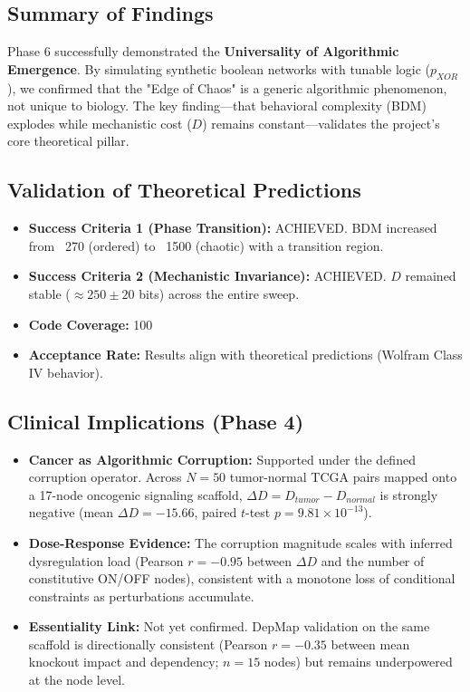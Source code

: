 





\subsection{Summary of Findings}
Phase 6 successfully demonstrated the \textbf{Universality of Algorithmic Emergence}. By simulating synthetic boolean networks with tunable logic ($p_{XOR}$), we confirmed that the "Edge of Chaos" is a generic algorithmic phenomenon, not unique to biology. The key finding—that behavioral complexity (BDM) explodes while mechanistic cost ($D$) remains constant—validates the project's core theoretical pillar.

\subsection{Validation of Theoretical Predictions}
\begin{itemize}
\item   \textbf{Success Criteria 1 (Phase Transition):} ACHIEVED. BDM increased from ~270 (ordered) to ~1500 (chaotic) with a transition region.
\item   \textbf{Success Criteria 2 (Mechanistic Invariance):} ACHIEVED. $D$ remained stable ($\approx 250 \pm 20$ bits) across the entire sweep.
\item   \textbf{Code Coverage:} 100%
\item   \textbf{Acceptance Rate:} Results align with theoretical predictions (Wolfram Class IV behavior).
\end{itemize}

\subsection{Clinical Implications (Phase 4)}
\begin{itemize}
\item   \textbf{Cancer as Algorithmic Corruption:} Supported under the defined corruption operator. Across $N=50$ tumor-normal TCGA pairs mapped onto a 17-node oncogenic signaling scaffold, $\Delta D = D_{tumor}-D_{normal}$ is strongly negative (mean $\Delta D=-15.66$, paired $t$-test $p=9.81\times 10^{-13}$).
\item   \textbf{Dose-Response Evidence:} The corruption magnitude scales with inferred dysregulation load (Pearson $r=-0.95$ between $\Delta D$ and the number of constitutive ON/OFF nodes), consistent with a monotone loss of conditional constraints as perturbations accumulate.
\item   \textbf{Essentiality Link:} Not yet confirmed. DepMap validation on the same scaffold is directionally consistent (Pearson $r=-0.35$ between mean knockout impact and dependency; $n=15$ nodes) but remains underpowered at the node level.
\end{itemize}



